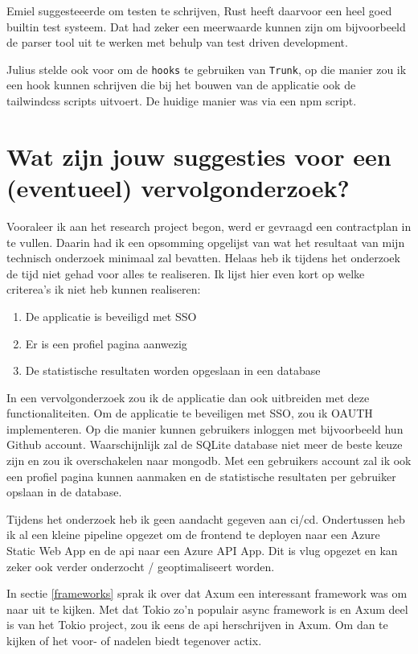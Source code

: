 Emiel suggesteeerde om testen te schrijven, Rust heeft daarvoor een heel goed builtin test systeem.
Dat had zeker een meerwaarde kunnen zijn om bijvoorbeeld de parser tool uit te werken met behulp van
test driven development.

Julius stelde ook voor om de \texttt{hooks} te gebruiken van \texttt{Trunk}, op
die manier zou ik een hook kunnen schrijven die bij het bouwen van de applicatie ook de tailwindcss
scripts uitvoert. De huidige manier was via een npm script.

\section{Wat zijn jouw suggesties voor een (eventueel) vervolgonderzoek?}

Vooraleer ik aan het research project begon, werd er gevraagd een contractplan in te vullen. 
Daarin had ik een opsomming opgelijst van wat het resultaat van mijn technisch onderzoek minimaal
zal bevatten. Helaas heb ik tijdens het onderzoek de tijd niet gehad voor alles te realiseren. 
Ik lijst hier even kort op welke criterea's ik niet heb kunnen realiseren:
\begin{enumerate}
  \item De applicatie is beveiligd met SSO
  \item Er is een profiel pagina aanwezig
  \item De statistische resultaten worden opgeslaan in een database
\end{enumerate}
In een vervolgonderzoek zou ik de applicatie dan ook uitbreiden met deze functionaliteiten. Om de
applicatie te beveiligen met SSO, zou ik OAUTH implementeren. Op die manier kunnen gebruikers
inloggen met bijvoorbeeld hun Github account. Waarschijnlijk zal de SQLite database niet meer de
beste keuze zijn en zou ik overschakelen naar mongodb. Met een gebruikers account zal ik ook een
profiel pagina kunnen aanmaken en de statistische resultaten per gebruiker opslaan in de database.

Tijdens het onderzoek heb ik geen aandacht gegeven aan ci/cd. Ondertussen heb ik al een kleine
pipeline opgezet om de frontend te deployen naar een Azure Static Web App en de api naar een Azure
API App. Dit is vlug opgezet en kan zeker ook verder onderzocht / geoptimaliseert worden.

In sectie \ref{frameworks} sprak ik over dat Axum een interessant framework was om naar uit te
kijken. Met dat Tokio zo'n populair async framework is en Axum deel is van het Tokio project, zou ik
eens de api herschrijven in Axum. Om dan te kijken of het voor- of nadelen biedt tegenover actix.

